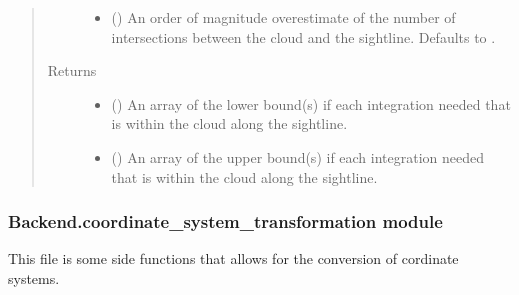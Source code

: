 \documentclass[letterpaper,10pt,english]{sphinxmanual}
\begin{document}
\begin{fulllineitems}
\begin{quote}
\begin{description}
\begin{itemize}
\item {} 
 () \textendash{} An order of magnitude overestimate of the number of intersections
between the cloud and the sightline. Defaults to .

\end{itemize}

\item[{Returns}] \leavevmode
\begin{itemize}
\item {} 
 () \textendash{} An array of the lower bound(s) if each integration needed that is
within the cloud along the sightline.

\item {} 
 () \textendash{} An array of the upper bound(s) if each integration needed that is
within the cloud along the sightline.

\end{itemize}


\end{description}\end{quote}

\end{fulllineitems}



\subsubsection{Backend.coordinate\_system\_transformation module}
\label{\detokenize{Backend.coordinate_system_transformation:module-Backend.coordinate_system_transformation}}\label{\detokenize{Backend.coordinate_system_transformation:backend-coordinate-system-transformation-module}}\label{\detokenize{Backend.coordinate_system_transformation::doc}}
This file is some side functions that allows for the conversion of cordinate
systems.
\end{document}
